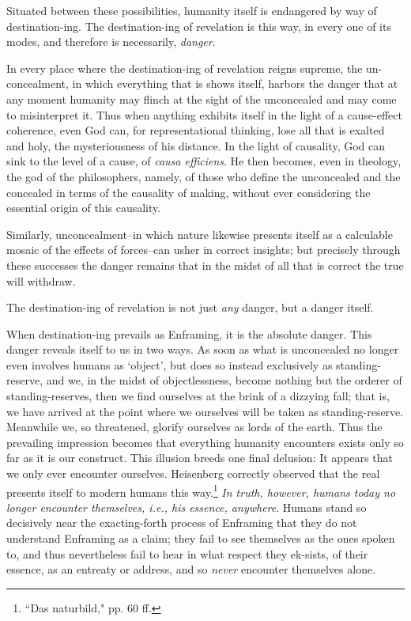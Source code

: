\documentclass[paper=a4, fontsize=11pt,twoside]{scrartcl}
\begin{document}
Situated between these possibilities, humanity itself is endangered by way of destination-ing. The destination-ing of revelation is this way, in every one of its modes, and therefore is necessarily, \textit{danger}.

In every place where the destination-ing of revelation reigns supreme, the un-concealment, in which everything that is shows itself, harbors the danger that at any moment humanity may flinch at the sight of the unconcealed and may come to misinterpret it. Thus when anything exhibits itself in the light of a cause-effect coherence, even God can, for representational thinking, lose all that is exalted and holy, the mysteriousness of his distance. In the light of causality, God can sink to the level of a cause, of \textit{causa efficiens}. He then becomes, even in theology, the god of the philosophers, namely, of those who define the unconcealed and the concealed in terms of the causality of making, without ever considering the essential origin of this causality.

Similarly, unconcealment--in which nature likewise presents itself as a calculable mosaic of the effects of forces--can usher in correct insights; but precisely through these successes the danger remains that in the midst of all that is correct the true will withdraw.

The destination-ing of revelation is not just \textit{any} danger, but a danger itself.

When destination-ing prevails as Enframing, it is the absolute danger. This danger reveals itself to us in two ways. As soon as what is unconcealed no longer even involves humans as `object', but does so instead exclusively as standing-reserve, and we, in the midst of objectlessness, become nothing but the orderer of standing-reserves, then we find ourselves at the brink of a dizzying fall; that is, we have arrived at the point where we ourselves will be taken as standing-reserve. Meanwhile we, so threatened, glorify ourselves as lords of the earth. Thus the prevailing impression becomes that everything humanity encounters exists only so far as it is our construct. This illusion breeds one final delusion: It appears that we only ever encounter ourselves. Heisenberg correctly observed that the real presents itself to modern humans this way.\footnote[2]{``Das naturbild," pp. 60 ff.} \textit{In truth, however, humans today no longer encounter themselves, i.e., his essence, anywhere}. Humans stand so decisively near the exacting-forth process of Enframing that they do not understand Enframing as a claim; they fail to see themselves as the ones spoken to, and thus nevertheless fail to hear in what respect they ek-sists, of their essence, as an entreaty or address, and so \textit{never} encounter themselves alone.
\end{document}
